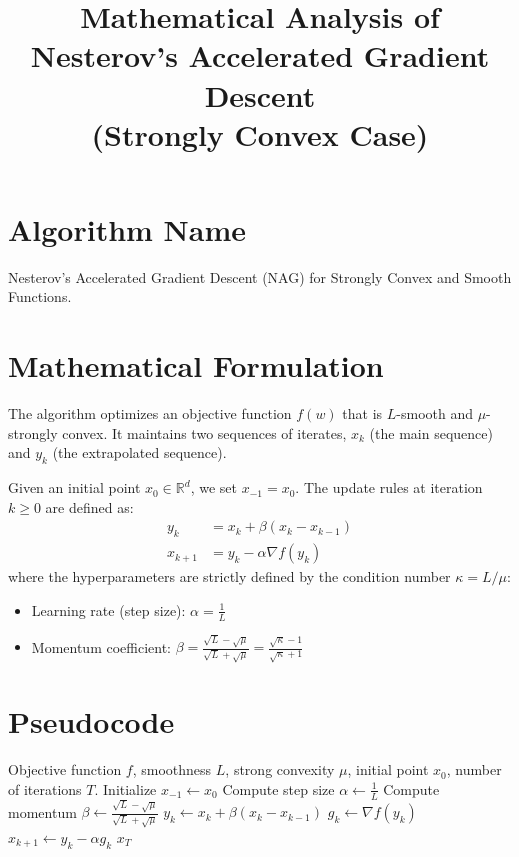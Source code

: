 \documentclass[11pt]{article}
\title{Mathematical Analysis of Nesterov's Accelerated Gradient Descent \\ (Strongly Convex Case)}
\author{}
\date{}
\begin{document}
\maketitle

\section*{Algorithm Name}
Nesterov's Accelerated Gradient Descent (NAG) for Strongly Convex and Smooth Functions.

\section*{Mathematical Formulation}
The algorithm optimizes an objective function $f(w)$ that is $L$-smooth and $\mu$-strongly convex. It maintains two sequences of iterates, $x_k$ (the main sequence) and $y_k$ (the extrapolated sequence). 

Given an initial point $x_0 \in \mathbb{R}^d$, we set $x_{-1} = x_0$. 
The update rules at iteration $k \ge 0$ are defined as:
\begin{align*}
    y_k &= x_k + \beta (x_k - x_{k-1}) \\
    x_{k+1} &= y_k - \alpha \nabla f(y_k)
\end{align*}
where the hyperparameters are strictly defined by the condition number $\kappa = L/\mu$:
\begin{itemize}
    \item Learning rate (step size): $\alpha = \frac{1}{L}$
    \item Momentum coefficient: $\beta = \frac{\sqrt{L} - \sqrt{\mu}}{\sqrt{L} + \sqrt{\mu}} = \frac{\sqrt{\kappa} - 1}{\sqrt{\kappa} + 1}$
\end{itemize}

\section*{Pseudocode}
\begin{algorithm}[H]
\caption{Nesterov's Accelerated Gradient Descent (Strongly Convex)}
\begin{algorithmic}[1]
\REQUIRE Objective function $f$, smoothness $L$, strong convexity $\mu$, initial point $x_0$, number of iterations $T$.
\STATE Initialize $x_{-1} \gets x_0$
\STATE Compute step size $\alpha \gets \frac{1}{L}$
\STATE Compute momentum $\beta \gets \frac{\sqrt{L} - \sqrt{\mu}}{\sqrt{L} + \sqrt{\mu}}$
    \STATE $y_k \gets x_k + \beta (x_k - x_{k-1})$
    \STATE $g_k \gets \nabla f(y_k)$
    \STATE $x_{k+1} \gets y_k - \alpha g_k$
\ENDFOR
\RETURN $x_T$
\end{algorithmic}
\end{algorithm}
\end{document}
